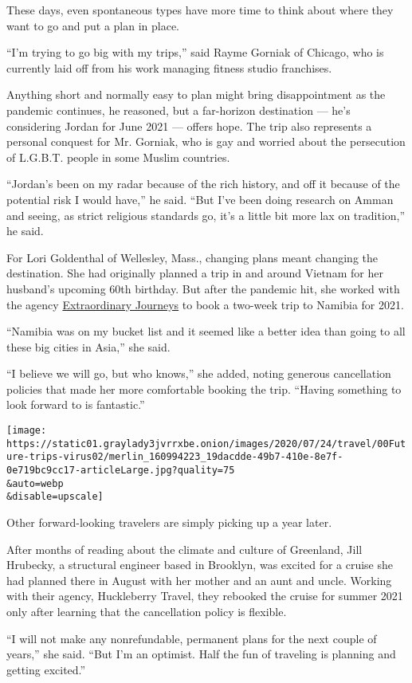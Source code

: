 These days, even spontaneous types have more time to think about where
they want to go and put a plan in place.

``I'm trying to go big with my trips,'' said Rayme Gorniak of Chicago,
who is currently laid off from his work managing fitness studio
franchises.

Anything short and normally easy to plan might bring disappointment as
the pandemic continues, he reasoned, but a far-horizon destination ---
he's considering Jordan for June 2021 --- offers hope. The trip also
represents a personal conquest for Mr. Gorniak, who is gay and worried
about the persecution of L.G.B.T. people in some Muslim countries.

``Jordan's been on my radar because of the rich history, and off it
because of the potential risk I would have,'' he said. ``But I've been
doing research on Amman and seeing, as strict religious standards go,
it's a little bit more lax on tradition,'' he said.

For Lori Goldenthal of Wellesley, Mass., changing plans meant changing
the destination. She had originally planned a trip in and around Vietnam
for her husband's upcoming 60th birthday. But after the pandemic hit,
she worked with the agency
\href{https://extraordinaryjourneys.com/}{Extraordinary Journeys} to
book a two-week trip to Namibia for 2021.

``Namibia was on my bucket list and it seemed like a better idea than
going to all these big cities in Asia,'' she said.

``I believe we will go, but who knows,'' she added, noting generous
cancellation policies that made her more comfortable booking the trip.
``Having something to look forward to is fantastic.''

\texttt{[image: https://static01.graylady3jvrrxbe.onion/images/2020/07/24/travel/00Future-trips-virus02/merlin\_160994223\_19dacdde-49b7-410e-8e7f-0e719bc9cc17-articleLarge.jpg?quality=75\\\&auto=webp\\\&disable=upscale]}

Other forward-looking travelers are simply picking up a year later.

After months of reading about the climate and culture of Greenland, Jill
Hrubecky, a structural engineer based in Brooklyn, was excited for a
cruise she had planned there in August with her mother and an aunt and
uncle. Working with their agency, Huckleberry Travel, they rebooked the
cruise for summer 2021 only after learning that the cancellation policy
is flexible.

``I will not make any nonrefundable, permanent plans for the next couple
of years,'' she said. ``But I'm an optimist. Half the fun of traveling
is planning and getting excited.''

